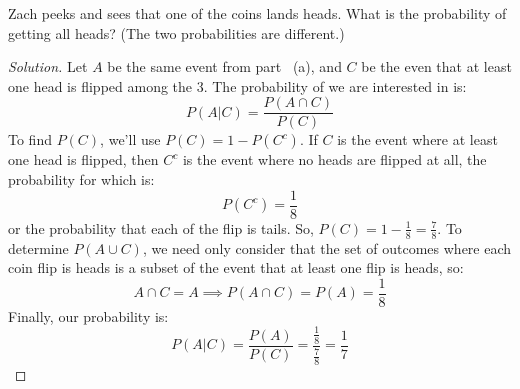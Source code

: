 \documentclass{article}
\begin{document}
		\item Zach peeks and sees that one of the coins lands heads. What is the
probability of getting all heads? (The two probabilities are different.)
\begin{proof}[Solution]
Let $A$ be the same event from part ~(a), and $C$ be the even that at least one head is flipped among the 3.
The probability of we are interested in is:
$$P(A|C) = \frac{P(A\cap C)}{P(C)}$$
To find $P(C)$, we'll use $P(C) = 1 - P(C^c)$.
If $C$ is the event where at least one head is flipped, then $C^c$ is the event where no heads are flipped at all, the probability for which is: 
$$P(C^c) = \frac{1}{8}$$
or the probability that each of the flip is tails.
So, $P(C) = 1 - \frac{1}{8} = \frac{7}{8}$.
To determine $P(A\cup C)$, we need only consider that the set of outcomes where each coin flip is heads is a subset of the event that at least one flip is heads, so:
$$A\cap C = A \implies P(A\cap C) = P(A) = \frac{1}{8}$$
Finally, our probability is:
$$P(A|C) = \frac{P(A)}{P(C)} = \frac{\frac{1}{8}}{\frac{7}{8}} = \frac{1}{7}$$
\end{proof}
			
\end{document}
